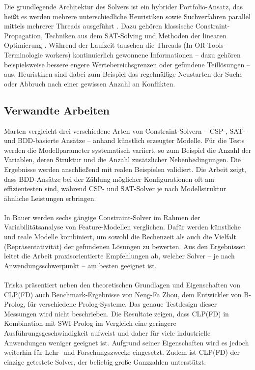 \documentclass[12pt,a4paper]{article}
\begin{document}
Die grundlegende Architektur des Solvers ist ein hybrider Portfolio-Ansatz, das heißt es werden mehrere unterschiedliche Heuristiken sowie Suchverfahren parallel mittels mehrerer Threads ausgeführt \cite{perron}.
Dazu gehören klassische Constraint-Propagation, Techniken aus dem SAT-Solving und Methoden der linearen Optimierung \cite{cp-sat-primer}.
Während der Laufzeit tauschen die Threads (In OR-Tools-Terminologie \glqq workers\grqq{}) kontinuierlich gewonnene Informationen -- dazu gehören beispielsweise bessere engere Wertebereichsgrenzen oder gefundene Teillösungen -- aus.
Heuristiken sind dabei zum Beispiel das regelmäßige Neustarten der Suche oder Abbruch nach einer gewissen Anzahl an Konflikten.

\subsection{Verwandte Arbeiten}
Marten \cite{marten2018} vergleicht drei verschiedene Arten von Constraint-Solvern – CSP-, SAT- und BDD-basierte Ansätze – anhand künstlich erzeugter Modelle.
Für die Tests werden die Modellparameter systematisch variiert, so zum Beispiel die Anzahl der Variablen, deren Struktur und die Anzahl zusätzlicher Nebenbedingungen.
Die Ergebnisse werden anschließend mit realen Beispielen validiert.
Die Arbeit zeigt, dass BDD-Ansätze bei der Zählung möglicher Konfigurationen oft am effizientesten sind, während CSP- und SAT-Solver je nach Modellstruktur ähnliche Leistungen erbringen.\\
\\
In Bauer \cite{bauer2019} werden sechs gängige Constraint-Solver im Rahmen der Variabilitätsanalyse von Feature-Modellen verglichen.
Dafür werden künstliche und reale Modelle kombiniert, um sowohl die Rechenzeit als auch die Vielfalt (Repräsentativität) der gefundenen Lösungen zu bewerten.
Aus den Ergebnissen leitet die Arbeit praxisorientierte Empfehlungen ab, welcher Solver – je nach Anwendungsschwerpunkt – am besten geeignet ist.\\
\\
Triska \cite{drt} präsentiert neben den theoretischen Grundlagen und Eigenschaften von CLP(FD) auch Benchmark-Ergebnisse von Neng-Fa Zhou, dem Entwickler von B-Prolog, für verschiedene Prolog-Systeme.
Das genaue Testdesign dieser Messungen wird nicht beschrieben.
Die Resultate zeigen, dass CLP(FD) in Kombination mit SWI-Prolog im Vergleich eine geringere Ausführungsgeschwindigkeit aufweist und daher für viele industrielle Anwendungen weniger geeignet ist.
Aufgrund seiner Eigenschaften wird es jedoch weiterhin für Lehr- und Forschungszwecke eingesetzt.
Zudem ist CLP(FD) der einzige getestete Solver, der beliebig große Ganzzahlen unterstützt. 
\end{document}
